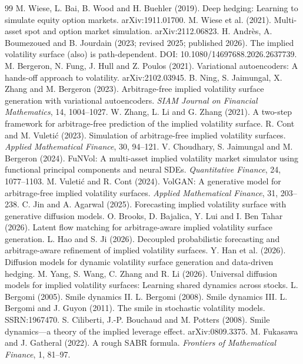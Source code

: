 \begin{thebibliography}{99}
 M. Wiese, L. Bai, B. Wood and H. Buehler (2019). Deep hedging: Learning to simulate equity option markets. arXiv:1911.01700.
 M. Wiese et al. (2021). Multi-asset spot and option market simulation. arXiv:2112.06823.
 H. Andrès, A. Boumezoued and B. Jourdain (2023; revised 2025; published 2026). The implied volatility surface (also) is path-dependent. DOI: 10.1080/14697688.2026.2637739.
 M. Bergeron, N. Fung, J. Hull and Z. Poulos (2021). Variational autoencoders: A hands-off approach to volatility. arXiv:2102.03945.
 B. Ning, S. Jaimungal, X. Zhang and M. Bergeron (2023). Arbitrage-free implied volatility surface generation with variational autoencoders. \emph{SIAM Journal on Financial Mathematics}, 14, 1004--1027.
 W. Zhang, L. Li and G. Zhang (2021). A two-step framework for arbitrage-free prediction of the implied volatility surface.
 R. Cont and M. Vuleti\'c (2023). Simulation of arbitrage-free implied volatility surfaces. \emph{Applied Mathematical Finance}, 30, 94--121.
 V. Choudhary, S. Jaimungal and M. Bergeron (2024). FuNVol: A multi-asset implied volatility market simulator using functional principal components and neural SDEs. \emph{Quantitative Finance}, 24, 1077--1103.
 M. Vuleti\'c and R. Cont (2024). VolGAN: A generative model for arbitrage-free implied volatility surfaces. \emph{Applied Mathematical Finance}, 31, 203--238.
 C. Jin and A. Agarwal (2025). Forecasting implied volatility surface with generative diffusion models.
 O. Brooks, D. Bajalica, Y. Lui and I. Ben Tahar (2026). Latent flow matching for arbitrage-aware implied volatility surface generation.
 L. Hao and S. Ji (2026). Decoupled probabilistic forecasting and arbitrage-aware refinement of implied volatility surfaces.
 Y. Han et al. (2026). Diffusion models for dynamic volatility surface generation and data-driven hedging.
 M. Yang, S. Wang, C. Zhang and R. Li (2026). Universal diffusion models for implied volatility surfaces: Learning shared dynamics across stocks.
 L. Bergomi (2005). Smile dynamics II.
 L. Bergomi (2008). Smile dynamics III.
 L. Bergomi and J. Guyon (2011). The smile in stochastic volatility models. SSRN:1967470.
 S. Ciliberti, J.-P. Bouchaud and M. Potters (2008). Smile dynamics---a theory of the implied leverage effect. arXiv:0809.3375.
 M. Fukasawa and J. Gatheral (2022). A rough SABR formula. \emph{Frontiers of Mathematical Finance}, 1, 81--97.

\end{thebibliography}
